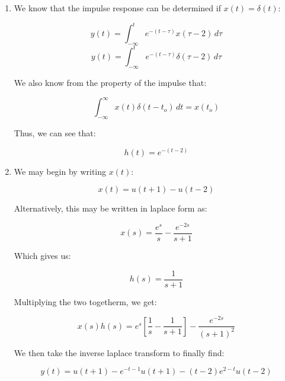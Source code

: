 \begin{enumerate}
\begin{enumerate}
      \item 

        We know that the impulse response can be determined if $x(t)=\delta(t)$:

        $$y(t)=\int_{-\infty}^{t}e^{-(t-\tau)}x(\tau-2)\,d\tau$$
        $$y(t)=\int_{-\infty}^{t}e^{-(t-\tau)}\delta(\tau-2)\,d\tau$$

        We also know from the property of the impulse that:

        $$\int_{-\infty}^{\infty} x(t)\delta(t-t_o)\,dt=x(t_o)$$

        Thus, we can see that:

        $$\boxed{h(t)=e^{-(t-2)}}$$

      \item 

        We may begin by writing $x(t)$:

        $$x(t)=u(t+1)-u(t-2)$$

        Alternatively, this may be written in laplace form as:

        $$x(s)=\frac{e^s}{s}-\frac{e^{-2s}}{s+1}$$

        Which gives us:

        $$h(s)=\frac{1}{s+1}$$

        Multiplying the two togetherm, we get:

        $$x(s)h(s)=e^s\left[ \frac{1}{s}-\frac{1}{s+1} \right]-\frac{e^{-2s}}{(s+1)^2}$$

        We then take the inverse laplace transform to finally find:

        $$\boxed{y(t)=u(t+1)-e^{-t-1}u(t+1)-(t-2)e^{2-t}u(t-2)}$$

        $$$$

    \end{enumerate}

\end{enumerate}



